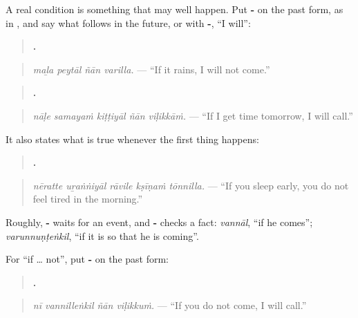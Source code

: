 \begin{grammarlens}[title={Grammar Lens: -\ml{ആൽ}, then what will happen}]
A real condition is something that may well happen. Put \textbf{-} on the past form, as in \textbf{}, and say what follows in the future, or with \textbf{-}, \textquotedblleft{}I will\textquotedblright{}:

\begin{quote}
\textbf{   .}
\end{quote}

\begin{quote}
\emph{maḻa peytāl ñān varilla.} — \textquotedblleft{}If it rains, I will not come.\textquotedblright{}
\end{quote}

\begin{quote}
\textbf{    .}
\end{quote}

\begin{quote}
\emph{nāḷe samayaṁ kiṭṭiyāl ñān viḷikkāṁ.} — \textquotedblleft{}If I get time tomorrow, I will call.\textquotedblright{}
\end{quote}

It also states what is true whenever the first thing happens:

\begin{quote}
\textbf{    .}
\end{quote}

\begin{quote}
\emph{nēratte uṟaṅṅiyāl rāvile kṣīṇaṁ tōnnilla.} — \textquotedblleft{}If you sleep early, you do not feel tired in the morning.\textquotedblright{}
\end{quote}

Roughly, \textbf{-} waits for an event, and \textbf{-} checks a fact: \emph{vannāl}, \textquotedblleft{}if he comes\textquotedblright{}; \emph{varunnuṇṭeṅkil}, \textquotedblleft{}if it is so that he is coming\textquotedblright{}.
\end{grammarlens}

\begin{grammarlens}[title={Grammar Lens: if it does not happen}]
For \textquotedblleft{}if … not\textquotedblright{}, put \textbf{-} on the past form:

\begin{quote}
\textbf{   .}
\end{quote}

\begin{quote}
\emph{nī vannilleṅkil ñān viḷikkuṁ.} — \textquotedblleft{}If you do not come, I will call.\textquotedblright{}
\end{quote}
\end{grammarlens}


